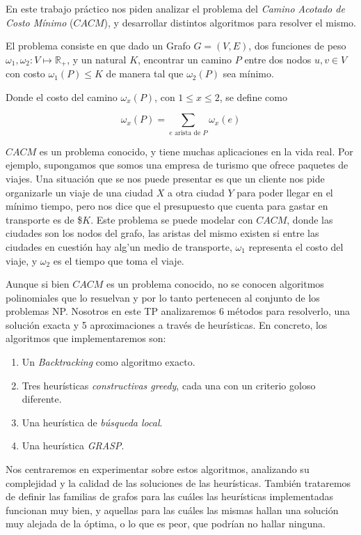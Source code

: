 
En este trabajo pr\'actico nos piden analizar el problema del \textit{Camino Acotado de Costo M\'inimo} ($CACM$), y desarrollar distintos algoritmos para resolver el mismo. 

El problema consiste en que dado un Grafo $G = (V,E)$, dos funciones de peso $\omega_1, \omega_2: V \mapsto \mathbb{R}_+$, y un natural $K$, encontrar un camino $P$ entre dos nodos $u, v \in V$ con costo $\omega_1(P) \leq K$ de manera tal que $\omega_2(P)$ sea m\'inimo. 

Donde el costo del camino $\omega_x(P)$, con $1 \leq x \leq 2$, se define como

\begin{equation*}
 \omega_x(P) = \sum_{e \text{ arista de } P} \omega_x(e)
\end{equation*}

$CACM$ es un problema conocido, y tiene muchas aplicaciones en la vida real. Por ejemplo, supongamos que somos una empresa de turismo que ofrece paquetes de viajes. Una situaci\'on que se nos puede presentar es que un cliente nos pide organizarle un viaje de una ciudad $X$ a otra ciudad $Y$ para poder llegar en el m\'inimo tiempo, pero nos dice que el presupuesto que cuenta para gastar en transporte es de \$$K$. Este problema se puede modelar con $CACM$, donde las ciudades son los nodos del grafo, las aristas del mismo existen si entre las ciudades en cuesti\'on hay alg'un medio de transporte, $\omega_1$ representa el costo del viaje, y $\omega_2$ es el tiempo que toma el viaje. 

Aunque si bien $CACM$ es un problema conocido, no se conocen algoritmos polinomiales que lo resuelvan y por lo tanto pertenecen al conjunto de los problemas NP. Nosotros en este TP analizaremos 6 m\'etodos para resolverlo, una soluci\'on exacta y 5 aproximaciones a trav\'es de heur\'isticas. En concreto, los algoritmos que implementaremos son: 

\begin{enumerate}
\item Un \textit{Backtracking} como algoritmo exacto.
\item Tres heur\'isticas \textit{constructivas greedy}, cada una con un criterio goloso diferente. 
\item Una heur\'istica de \textit{b\'usqueda local}.
\item Una heur\'istica \textit{GRASP}.
\end{enumerate}

Nos centraremos en experimentar sobre estos algoritmos, analizando su complejidad y la calidad de las soluciones de las heur\'isticas. Tambi\'en trataremos de definir las familias de grafos para las cu\'ales las heur\'isticas implementadas funcionan muy bien, y aquellas para las cu\'ales las mismas hallan una soluci\'on muy alejada de la \'optima, o lo que es peor, que podr\'ian no hallar ninguna. 